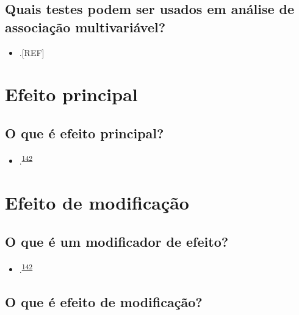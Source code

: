 \documentclass[
  a4paper,
]{book}
\providecommand{\tightlist}{%
  \setlength{\itemsep}{0pt}\setlength{\parskip}{0pt}}
\begin{document}
\hypertarget{quais-testes-podem-ser-usados-em-anuxe1lise-de-associauxe7uxe3o-multivariuxe1vel}{%
\subsection{Quais testes podem ser usados em análise de associação multivariável?}\label{quais-testes-podem-ser-usados-em-anuxe1lise-de-associauxe7uxe3o-multivariuxe1vel}}

\begin{itemize}
\tightlist
\item
  .{[}REF{]}
\end{itemize}

\hypertarget{efeito-principal}{%
\section{Efeito principal}\label{efeito-principal}}

\hypertarget{o-que-uxe9-efeito-principal}{%
\subsection{O que é efeito principal?}\label{o-que-uxe9-efeito-principal}}

\begin{itemize}
\tightlist
\item
  .\textsuperscript{\protect\hyperlink{ref-Bours2023}{142}}
\end{itemize}

\hypertarget{modificacao}{%
\section{Efeito de modificação}\label{modificacao}}

\hypertarget{o-que-uxe9-um-modificador-de-efeito}{%
\subsection{O que é um modificador de efeito?}\label{o-que-uxe9-um-modificador-de-efeito}}

\begin{itemize}
\tightlist
\item
  .\textsuperscript{\protect\hyperlink{ref-Bours2023}{142}}
\end{itemize}

\hypertarget{o-que-uxe9-efeito-de-modificauxe7uxe3o}{%
\subsection{O que é efeito de modificação?}\label{o-que-uxe9-efeito-de-modificauxe7uxe3o}}
\end{document}
